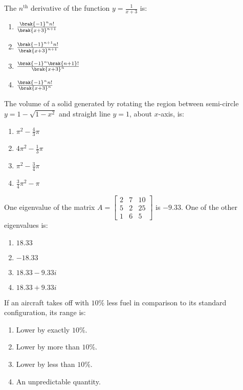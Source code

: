     \item The $n^{\text{th}}$ derivative of the function $ y = \frac{1}{x+3} $ is:
    \begin{enumerate}
        \item $ \frac{\brak{-1}^n n!}{\brak{x+3}^{n+1}} $
        \item $ \frac{\brak{-1}^{n+1} n!}{\brak{x+3}^{n+1}} $
        \item $ \frac{\brak{-1}^n \brak{n+1}!}{\brak{x+3}^n} $
        \item $ \frac{\brak{-1}^n n!}{\brak{x+3}^n} $
    \end{enumerate}

    \item The volume of a solid generated by rotating the region between semi-circle $ y = 1 - \sqrt{1 - x^2} $ and straight line $ y = 1 $, about $ x $-axis, is:
    \begin{enumerate}
        \item $ \pi^2 - \frac{4}{3} \pi $
        \item $ 4 \pi^2 - \frac{1}{3} \pi $
        \item $ \pi^2 - \frac{3}{4} \pi $
        \item $ \frac{3}{4} \pi^2 - \pi $
    \end{enumerate}

    \item One eigenvalue of the matrix $ A = \begin{bmatrix} 2 & 7 & 10 \\ 5 & 2 & 25 \\ 1 & 6 & 5 \end{bmatrix} $ is $ -9.33 $. One of the other eigenvalues is:
    \begin{enumerate}
        \item $ 18.33 $
        \item $ -18.33 $
        \item $ 18.33 - 9.33i $
        \item $ 18.33 + 9.33i $
    \end{enumerate}

    \item If an aircraft takes off with $10\%$ less fuel in comparison to its standard configuration, its range is:
    \begin{enumerate}
        \item Lower by exactly $10\%$.
        \item Lower by more than $10\%$.
        \item Lower by less than $10\%$.
        \item An unpredictable quantity.
    \end{enumerate}

